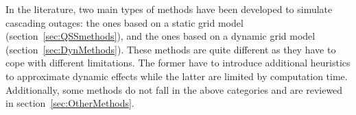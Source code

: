 In the literature, two main types of methods have been developed to simulate cascading outages: the ones based on a static grid model (section~\ref{sec:QSSmethods}), and the ones based on a dynamic grid model (section~\ref{sec:DynMethods}). These methods are quite different as they have to cope with different limitations. The former have to introduce additional heuristics to approximate dynamic effects while the latter are limited by computation time. Additionally, some methods do not fall in the above categories and are reviewed in section~\ref{sec:OtherMethods}.







